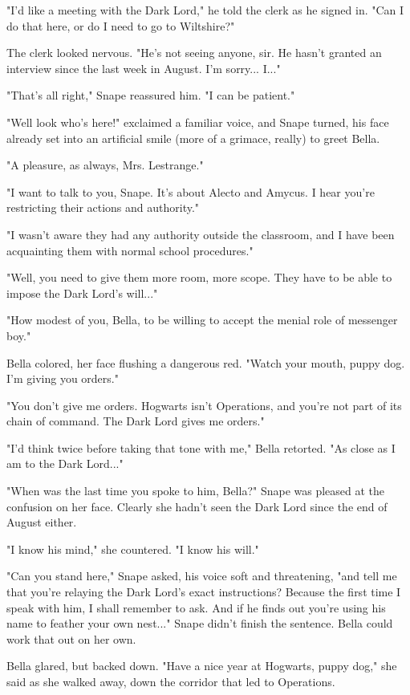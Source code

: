 \documentclass[a4paper,11pt]{article}
\begin{document}
"I'd like a meeting with the Dark Lord," he told the clerk as he signed in. "Can I do that here, or do I need to go to Wiltshire?"

The clerk looked nervous. "He's not seeing anyone, sir. He hasn't granted an interview since the last week in August. I'm sorry... I..."

"That's all right," Snape reassured him. "I can be patient."

"Well look who's here!" exclaimed a familiar voice, and Snape turned, his face already set into an artificial smile (more of a grimace, really) to greet Bella.

"A pleasure, as always, Mrs. Lestrange."

"I want to talk to you, Snape. It's about Alecto and Amycus. I hear you're restricting their actions and authority."

"I wasn't aware they had any authority outside the classroom, and I have been acquainting them with normal school procedures."

"Well, you need to give them more room, more scope. They have to be able to impose the Dark Lord's will..."

"How modest of you, Bella, to be willing to accept the menial role of messenger boy."

Bella colored, her face flushing a dangerous red. "Watch your mouth, puppy dog. I'm giving you orders."

"You don't give me orders. Hogwarts isn't Operations, and you're not part of its chain of command. The Dark Lord gives me orders."

"I'd think twice before taking that tone with me," Bella retorted. "As close as I am to the Dark Lord..."

"When was the last time you spoke to him, Bella?" Snape was pleased at the confusion on her face. Clearly she hadn't seen the Dark Lord since the end of August either.

"I know his mind," she countered. "I know his will."

"Can you stand here," Snape asked, his voice soft and threatening, "and tell me that you're relaying the Dark Lord's exact instructions? Because the first time I speak with him, I shall remember to ask. And if he finds out you're using his name to feather your own nest..." Snape didn't finish the sentence. Bella could work that out on her own.

Bella glared, but backed down. "Have a nice year at Hogwarts, puppy dog," she said as she walked away, down the corridor that led to Operations.
\end{document}
